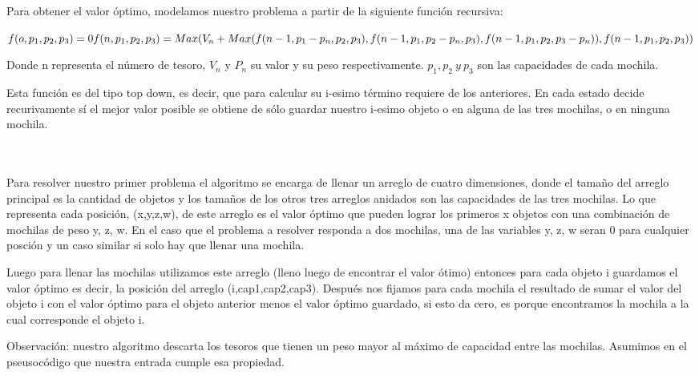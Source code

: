 \documentclass[spanish,12pt]{article}
\begin{document}
   Para obtener el valor óptimo, modelamos nuestro problema a partir de la siguiente función recursiva:

	$f(o,p_{1},p_{2},p_{3})=0 \\
	f(n,p_{1},p_{2},p_{3}) = Max(V_{n}+Max(f(n-1,p_{1}-p_{n},p_{2},p_{3}), f(n-1,p_{1},p_{2}-p_{n},p_{3}), f(n-1,p_{1},p_{2},p_{3}-p_{n})),f(n-1,p_{1},p_{2},p_{3})) $

	Donde n representa el número de tesoro, $V_{n}$ y $P_{n}$ su valor y su peso respectivamente. $p_{1},p_{2}\ y \ p_{3}$ son las capacidades de cada mochila.

	Esta función es del tipo top down, es decir, que para calcular su i-esimo término requiere de los anteriores. En cada estado decide recurivamente sí el mejor valor posible se obtiene de sólo guardar nuestro i-esimo objeto o en alguna de las tres mochilas, o en ninguna mochila.  



\\

\\
	Para resolver nuestro primer problema el algoritmo se encarga de llenar un arreglo de cuatro dimensiones, donde el tamaño del arreglo principal es la cantidad de objetos y los tamaños de los otros tres arreglos anidados son las capacidades de las tres mochilas.
	Lo que representa cada posición, (x,y,z,w), de este arreglo es el valor óptimo que pueden lograr los primeros x objetos con una combinación de mochilas de peso y, z, w. En el caso que el problema a resolver responda a dos mochilas, una de las variables y, z, w seran 0 para cualquier posción y un caso similar si solo hay que llenar una mochila.

	Luego para llenar las mochilas utilizamos este arreglo (lleno luego de encontrar el valor ótimo) entonces para cada objeto i guardamos el valor óptimo es decir, la posición del arreglo (i,cap1,cap2,cap3). Después nos fijamos para cada mochila  el resultado de sumar el valor del objeto i con el valor óptimo para el objeto anterior menos el valor óptimo guardado, si esto da cero, es porque encontramos la mochila a la cual corresponde el objeto i. 



Observación: nuestro algoritmo descarta los tesoros que tienen un peso mayor al máximo de capacidad entre las mochilas. Asumimos en el pseusocódigo que nuestra entrada cumple esa propiedad.
\end{document}
